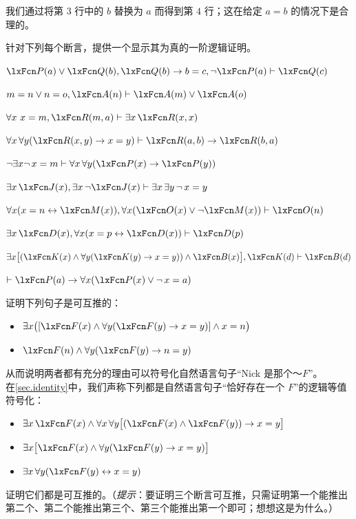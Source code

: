 我们通过将第 $3$ 行中的 $b$ 替换为 $a$ 而得到第 $4$ 行；这在给定 $a= b$ 的情况下是合理的。

\practiceproblems
\problempart
\label{pr.identity}
针对下列每个断言，提供一个显示其为真的一阶逻辑证明。
\begin{compactlist}
\item $\atom{P}{a} \eor \atom{Q}{b}, \atom{Q}{b} \eif b=c, \enot\atom{P}{a} \proves \atom{Q}{c}$
\item $m=n \eor n=o, \atom{A}{n} \proves \atom{A}{m} \eor \atom{A}{o}$
\item $\forall x\ x=m, \atom{R}{m,a} \proves \exists x\,\atom{R}{x,x}$
\item $\forall x\,\forall y(\atom{R}{x,y} \eif x=y)\proves \atom{R}{a,b} \eif \atom{R}{b,a}$
\item $\enot \exists x\enot\, {x = m} \proves \forall x\,\forall y (\atom{P}{x} \eif \atom{P}{y})$
\item $\exists x\,\atom{J}{x}, \exists x\, \enot\atom{J}{x}\proves \exists x\, \exists y\, \enot\, {x = y}$
\item $\forall x(x=n \eiff \atom{M}{x}), \forall x(\atom{O}{x} \eor \enot \atom{M}{x})\proves \atom{O}{n}$
\item $\exists x\,\atom{D}{x}, \forall x(x=p \eiff \atom{D}{x})\proves \atom{D}{p}$
\item $\exists x\bigl[(\atom{K}{x} \eand \forall y(\atom{K}{y} \eif x=y)) \eand \atom{B}{x}\bigr], \atom{K}{d} \proves \atom{B}{d}$
\item $\proves \atom{P}{a} \eif \forall x(\atom{P}{x} \eor \enot\, {x = a})$
\end{compactlist}

\problempart
证明下列句子是可互推的：
\begin{itemize}
\item $\exists x \bigl([\atom{F}{x} \eand \forall y (\atom{F}{y} \eif x = y)] \eand x = n\bigr)$
\item $\atom{F}{n} \eand \forall y (\atom{F}{y} \eif n= y)$
\end{itemize}
从而说明两者都有充分的理由可以符号化自然语言句子“Nick 是那个～$F$”。\\

\problempart
在\cref{sec.identity}中，我们声称下列都是自然语言句子“恰好存在一个 $F$”的逻辑等值符号化：
\begin{itemize}
\item $\exists x\,\atom{F}{x} \eand \forall x\, \forall y \bigl[(\atom{F}{x} \eand \atom{F}{y}) \eif x = y\bigr]$
\item $\exists x \bigl[\atom{F}{x} \eand \forall y (\atom{F}{y} \eif x = y)\bigr]$
\item $\exists x\, \forall y (\atom{F}{y} \eiff x = y)$
\end{itemize}
证明它们都是可互推的。（\emph{提示}：要证明三个断言可互推，只需证明第一个能推出第二个、第二个能推出第三个、第三个能推出第一个即可；想想这是为什么。）

